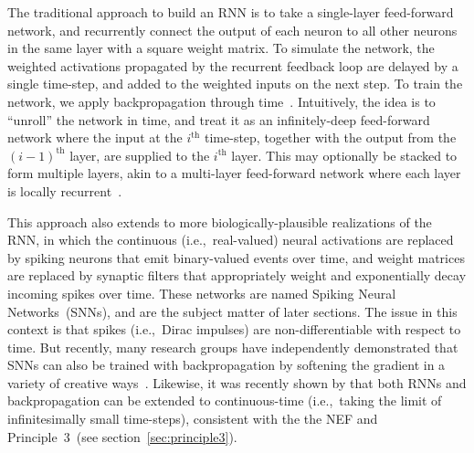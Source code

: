 The traditional approach to build an RNN is to take a single-layer feed-forward network, and recurrently connect the output of each neuron to all other neurons in the same layer with a square weight matrix.
To simulate the network, the weighted activations propagated by the recurrent feedback loop are delayed by a single time-step, and added to the weighted inputs on the next step.
To train the network, we apply backpropagation through time~\citep[BPTT;][]{werbos1990backpropagation}.
Intuitively, the idea is to ``unroll'' the network in time, and treat it as an infinitely-deep feed-forward network where the input at the $i^\text{th}$ time-step, together with the output from the $(i-1)^\text{th}$ layer, are supplied to the $i^\text{th}$ layer.
This may optionally be stacked to form multiple layers, akin to a multi-layer feed-forward network where each layer is locally recurrent~\citep{pascanu2013construct}.

This approach also extends to more biologically-plausible realizations of the RNN, in which the continuous (i.e.,~real-valued) neural activations are replaced by spiking neurons that emit binary-valued events over time, and weight matrices are replaced by synaptic filters that appropriately weight and exponentially decay incoming spikes over time.
These networks are named Spiking Neural Networks~(SNNs), and are the subject matter of later sections.
The issue in this context is that spikes (i.e.,~Dirac impulses) are non-differentiable with respect to time.
But recently, many research groups have independently demonstrated that SNNs can also be trained with backpropagation by softening the gradient in a variety of creative ways~\citep{hunsberger2015spiking, hunsberger2016training, marblestone2016toward, neftci2017neuromorphic, bellec2018long, hunsberger2018, huh2018gradient, severa2018whetstone, rasmussen2018nengodl, neftci2019surrogate}.
Likewise, it was recently shown by \citet{chen2018neural} that both RNNs and backpropagation can be extended to continuous-time (i.e.,~taking the limit of infinitesimally small time-steps), consistent with the the NEF and Principle~3~(see section~\ref{sec:principle3}).
 
